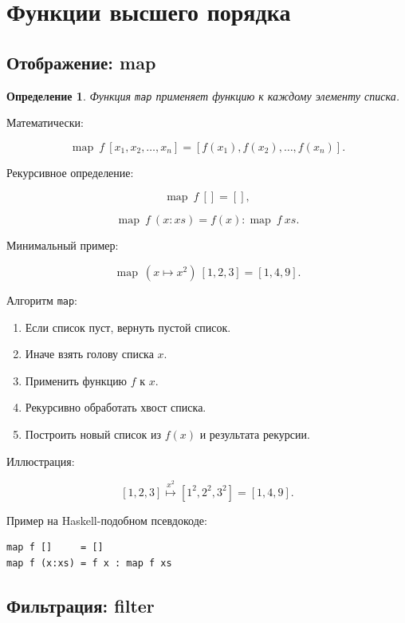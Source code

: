 \documentclass[12pt,a4paper]{article}
\newtheorem{definition}{Определение}
\begin{document}
\section{Функции высшего порядка}

\subsection{Отображение: map}

\begin{definition}
Функция \texttt{map} применяет функцию к каждому элементу списка.
\end{definition}

Математически:

\[
\operatorname{map}\ f\ [x_1,x_2,\dots,x_n]
=
[f(x_1), f(x_2), \dots, f(x_n)].
\]

Рекурсивное определение:

\[
\operatorname{map}\ f\ [] = [],
\]

\[
\operatorname{map}\ f\ (x:xs) = f(x) : \operatorname{map}\ f\ xs.
\]

Минимальный пример:

\[
\operatorname{map}\ (x \mapsto x^2)\ [1,2,3] = [1,4,9].
\]

Алгоритм \texttt{map}:

\begin{enumerate}
  \item Если список пуст, вернуть пустой список.
  \item Иначе взять голову списка $x$.
  \item Применить функцию $f$ к $x$.
  \item Рекурсивно обработать хвост списка.
  \item Построить новый список из $f(x)$ и результата рекурсии.
\end{enumerate}

Иллюстрация:

\[
[1,2,3]
\overset{x^2}{\longmapsto}
[1^2,2^2,3^2]
=
[1,4,9].
\]

Пример на Haskell-подобном псевдокоде:

\begin{lstlisting}
map f []     = []
map f (x:xs) = f x : map f xs
\end{lstlisting}

\subsection{Фильтрация: filter}
\end{document}
